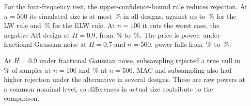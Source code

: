 For the four-frequency test, the upper-confidence-bound rule reduces rejection. At $n=500$ its simulated size is at most
\,\% in all  designs, against up to \,\%
for the LW rule and \,\% for the ELW rule. At $n=100$ it cuts the worst case, the
negative-AR design at $H=0.9$, from \,\% to \,\%. The price
is power: under fractional Gaussian noise at $H=0.7$ and $n=500$, power falls from \,\%
to \,\%.

At $H=0.9$ under fractional Gaussian noise, subsampling rejected a true null in \,\% of
samples at $n=100$ and \,\% at $n=500$. MAC and subsampling also had higher rejection
under the alternative in several designs. These are raw powers at a common nominal level, so differences in actual
size contribute to the comparison.
